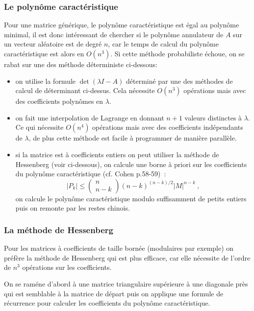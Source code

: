 \documentclass[a4paper,11pt]{article}
\begin{document}
\begin{giacjshere}
\subsubsection{Le polyn\^ome caract\'eristique}
Pour une matrice générique, le polynôme caractéristique est égal
au polynôme minimal, il est donc intéressant de chercher si le polynôme
annulateur de $A$ sur un vecteur aléatoire est de degré $n$, 
car le temps de calcul du polynôme caractéristique est alors en $O(n^3)$. 
Si cette méthode probabiliste échoue, on se
rabat sur une des méthode déterministe ci-dessous:
\begin{itemize}
\item on utilise la formule $\det(\lambda I -A)$ déterminé par
une des m\'ethodes de calcul de d\'eterminant ci-dessus. Cela
nécessite $O(n^3)$ opérations mais avec des coefficients 
polynômes en $\lambda$.
\item on fait une interpolation de Lagrange en donnant $n+1$ valeurs
distinctes \`a $\lambda$. Ce qui nécessite $O(n^4)$ opérations mais avec
des coefficients indépendants de $\lambda$, de plus cette m\'ethode 
est facile \`a programmer de mani\`ere parall\`ele.
\item si la matrice est \`a coefficients entiers
on peut utiliser la m\'ethode de Hessenberg (voir ci-dessous), on calcule
une borne \`a priori sur les coefficients du polyn\^ome caract\'eristique
(cf. Cohen p.58-59)~:
\[ |P_k| \leq \left( \begin{array}{c} n \\ n-k\end{array}\right) 
(n-k)^{(n-k)/2} |M|^{n-k} \ ,\]
on calcule le polyn\^ome caract\'eristique modulo suffisamment
de petits entiers puis on remonte par les restes chinois.
\end{itemize}

\subsubsection{La m\'ethode de Hessenberg}
Pour les matrices \`a coefficients de taille born\'ee (modulaires par exemple)
on préfère la m\'ethode de Hessenberg qui est plus
efficace, car elle n\'ecessite de l'ordre de $n^3$ op\'erations sur
les coefficients.

On se ram\'ene d'abord \`a une matrice triangulaire supérieure à
une diagonale près qui est semblable \`a la
matrice de d\'epart puis on
applique une formule de r\'ecurrence pour calculer les coefficients
du polyn\^ome caract\'eristique.


\end{giacjshere}
\end{document}

